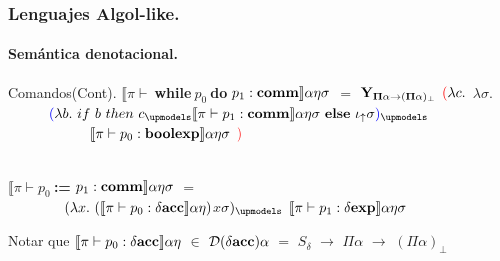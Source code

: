 \documentclass{beamer} %
\newcommand{\semBrcks}[1]{\llbracket #1 \rrbracket}
\newcommand{\D}{\mathcal{D}}
\newcommand{\deltaexp}{\delta \bf{exp}}
\newcommand{\boolexp}{\bf{boolexp}}
\newcommand{\deltaacc}{\delta \bf{acc}}
\newcommand{\comm}{\bf{comm}}
\newcommand{\whiledo}[2]{\ $\bf{while}$ \ #1 \ $\bf{do}$ \ #2}
\newcommand{\assig}[2]{#1 \ ${\bf :=}$ \ #2}
\newcommand{\denotalsem}[5]{\semBrcks{#1 \vdash #2} #3 #4 #5}
\newcommand{\iotabot}{\iota_{\uparrow}}
\newcommand{\parentcolor}[2]{\textcolor{#1}{(} #2 \textcolor{#1}{)}}
\newcommand{\Y}{\bf{Y}}
\newcommand{\setstate}{\Pi \alpha}
\newcommand{\Dcomm}{\setstate \rightarrow (\setstate)_\bot}
\begin{document}
\begin{frame}
\frametitle{Lenguajes Algol-like.}
\framesubtitle{Sem\'antica denotacional.}

\begin{block}{Comandos(Cont).}
$\denotalsem{\pi}{\whiledo{p_0}{p_1}:\comm}{\alpha}{\eta}{\sigma}$ $=$ $\Y_{\Dcomm}$ $\textcolor{red}{(}\lambda c .$ $\lambda \sigma .$\\
\ \ \ \ \ $\parentcolor{blue}{
\lambda b. \ if \ b \ then \ c_{\upmodels} \denotalsem{\pi}{p_1:\comm}{\alpha}{\eta}{\sigma} \ else \ \iotabot \sigma
}_{\upmodels}$ \\
\ \ \ \ \ \ \ \ \ \ $\denotalsem{\pi}{p_0:\boolexp}{\alpha}{\eta}{\sigma}$ $\textcolor{red}{)}$\\

\

$\denotalsem{\pi}{\assig{p_0}{p_1}:\comm}{\alpha}{\eta}{\sigma}$ $=$ \\
\ \ \ \ \ \ \ \ $(\lambda x. \ (\denotalsem{\pi}{p_0:\deltaacc}{\alpha}{\eta})$$x$${\sigma})_{\upmodels}$ 
$\denotalsem{\pi}{p_1:\deltaexp}{\alpha}{\eta}{\sigma}$ \\



\end{block}

\begin{block}{}
Notar que $\denotalsem{\pi}{p_0:\deltaacc}{\alpha}{\eta}$ $\in$ $\D(\deltaacc)\alpha$ $=$ $S_\delta$ $\rightarrow$ $\setstate$ $\rightarrow$ $(\setstate)_\bot$
\\
\end{block}
\end{frame}
\end{document}

